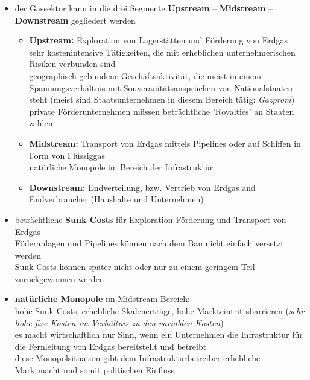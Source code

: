 \documentclass[11pt,a4paper]{article}
\begin{document}
\begin{itemize}
\item der Gassektor kann in die drei Segmente \textbf{Upstream} -- \textbf{Midstream} -- \textbf{Downstream} gegliedert werden

	\begin{itemize}
	\item \textbf{Upstream:} Exploration von Lagerstätten und Förderung von Erdgas\\
	 sehr kostenintensive Tätigkeiten, die mit erheblichen unternehmerischen Risiken verbunden sind\\
	 geographisch gebundene Geschäftsaktivität, die meist in einem Spannungsverhältnis mit Souveränitätsansprüchen von Nationalstaaten steht (meist sind Staatsunternehmen in diesem Bereich tätig: \textsl{Gazprom})\\
	 private Förderunternehmen müssen beträchtliche 'Royalties' an Staaten zahlen

	\vspace{1cm}

	\item \textbf{Midstream:} Transport von Erdgas mittels Pipelines oder auf Schiffen in Form von Flüssiggas\\
	 natürliche Monopole im Bereich der Infrastruktur

	\vspace{1cm}

	\item \textbf{Downstream:} Endverteilung, bzw. Vertrieb von Erdgas and Endverbraucher (Haushalte und Unternehmen)

	\vspace{1cm}

	\end{itemize}

\item beträchtliche \textbf{Sunk Costs} für Exploration Förderung und Transport von Erdgas\\
 Föderanlagen und Pipelines können nach dem Bau nicht einfach versetzt werden\\
 Sunk Costs können später nicht oder nur zu einem geringem Teil zurückgewonnen werden\\

\item \textbf{natürliche Monopole} im Midstream-Bereich:\\
 hohe Sunk Costs, erhebliche Skalenerträge, hohe Markteintrittsbarrieren (\textsl{sehr hohe fixe Kosten im Verhältnis zu den variablen Kosten})\\
 es macht wirtschaftlich nur Sinn, wenn ein Unternehmen die Infrastruktur für die Fernleitung von Erdgas bereitstellt und betreibt\\
 diese Monopolsituation gibt dem Infrastrukturbetreiber erhebliche Marktmacht und somit politischen Einfluss



\end{itemize}
\end{document}
